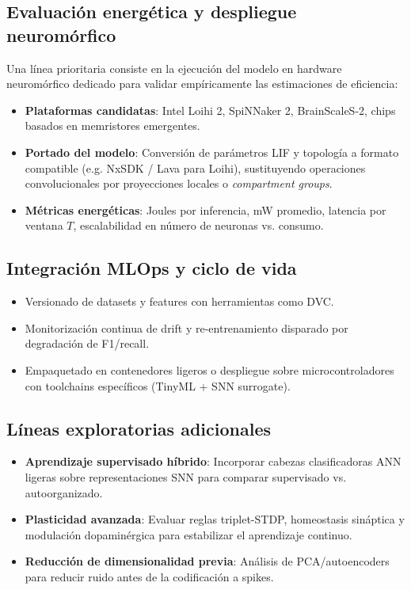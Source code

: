 \subsection{Evaluación energética y despliegue neuromórfico}
\label{subsec:trabajo-futuro-neuromorfico}
Una línea prioritaria consiste en la ejecución del modelo en hardware neuromórfico dedicado para validar empíricamente las estimaciones de eficiencia:
\begin{itemize}
    \item \textbf{Plataformas candidatas}: Intel Loihi 2, SpiNNaker 2, BrainScaleS-2, chips basados en memristores emergentes.
    \item \textbf{Portado del modelo}: Conversión de parámetros LIF y topología a formato compatible (e.g. NxSDK / Lava para Loihi), sustituyendo operaciones convolucionales por proyecciones locales o \textit{compartment groups}.
    \item \textbf{Métricas energéticas}: Joules por inferencia, mW promedio, latencia por ventana \(T\), escalabilidad en número de neuronas vs. consumo.
\end{itemize}

\subsection{Integración MLOps y ciclo de vida}
\begin{itemize}
    \item Versionado de datasets y features con herramientas como DVC.
    \item Monitorización continua de drift y re-entrenamiento disparado por degradación de F1/recall.
    \item Empaquetado en contenedores ligeros o despliegue sobre microcontroladores con toolchains específicos (TinyML + SNN surrogate).
\end{itemize}

\subsection{Líneas exploratorias adicionales}
\begin{itemize}
    \item \textbf{Aprendizaje supervisado híbrido}: Incorporar cabezas clasificadoras ANN ligeras sobre representaciones SNN para comparar supervisado vs. autoorganizado.
    \item \textbf{Plasticidad avanzada}: Evaluar reglas triplet-STDP, homeostasis sináptica y modulación dopaminérgica para estabilizar el aprendizaje continuo.
    \item \textbf{Reducción de dimensionalidad previa}: Análisis de PCA/autoencoders para reducir ruido antes de la codificación a spikes.
\end{itemize}
